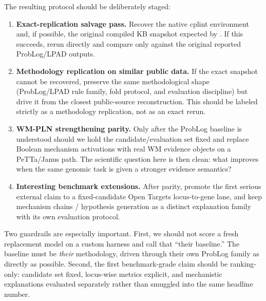 \documentclass[11pt,openany]{report}
\begin{document}
The resulting protocol should be deliberately staged:
\begin{enumerate}
\item \textbf{Exact-replication salvage pass.}  Recover the native cplint
  environment and, if possible, the original compiled KB snapshot expected by
  .  If this succeeds, rerun
   directly and compare only against the original
  reported ProbLog/LPAD outputs.
\item \textbf{Methodology replication on similar public data.}  If the exact
  snapshot cannot be recovered, preserve the same methodological shape
  (ProbLog/LPAD rule family, fold protocol, and evaluation discipline) but
  drive it from the closest public-source reconstruction.  This should be
  labeled strictly as a methodology replication, not as an exact rerun.
\item \textbf{WM-PLN strengthening parity.}  Only after the ProbLog baseline is
  understood should we hold the candidate/evaluation set fixed and replace
  Boolean mechanism activations with real WM evidence objects on a PeTTa/Janus
  path.  The scientific question here is then clean: what improves when the
  same genomic task is given a stronger evidence semantics?
\item \textbf{Interesting benchmark extensions.}  After parity, promote the
  first serious external claim to a fixed-candidate Open Targets locus-to-gene
  lane, and keep mechanism chains / hypothesis generation as a distinct
  explanation family with its own evaluation protocol.
\end{enumerate}

Two guardrails are especially important.  First, we should not score a fresh
replacement model on a custom harness and call that ``their baseline.''  The
baseline must be \emph{their} methodology, driven through their own ProbLog
family as directly as possible.  Second, the first benchmark-grade claim should
be ranking-only: candidate set fixed, locus-wise metrics explicit, and
mechanistic explanations evaluated separately rather than smuggled into the
same headline number.
\end{document}
